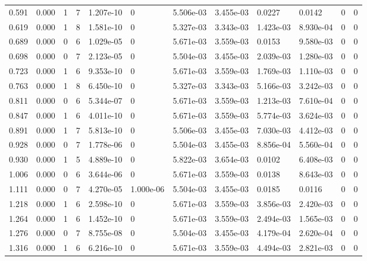 \documentclass[preview]{standalone}
\begin{document}
{{\begin{tabular}{L{1.2cm}C{1.2cm} C{0.3cm}C{0.5cm} C{1.4cm}C{1.4cm} C{1.4cm}C{1.4cm} C{1.6cm}C{1.6cm} C{1.6cm}C{1.6cm}}
  0.591  &  0.000  & 1     &  7 &  1.207e-10  & 0  &  5.506e-03&   3.455e-03& 0.0227 & 0.0142   &  0 & 0  \\ 
  0.619  &  0.000  & 1     &  8 &  1.581e-10  & 0  &  5.327e-03&   3.343e-03& 1.423e-03 & 8.930e-04   &  0 & 0  \\ 
  0.689  &  0.000  & 0     &  6 &  1.029e-05  & 0  &  5.671e-03&   3.559e-03& 0.0153 & 9.580e-03   &  0 & 0  \\ 
  0.698  &  0.000  & 0     &  7 &  2.123e-05  & 0  &  5.504e-03&   3.455e-03& 2.039e-03 & 1.280e-03   &  0 & 0  \\ 
  0.723  &  0.000  & 1     &  6 &  9.353e-10  & 0  &  5.671e-03&   3.559e-03& 1.769e-03 & 1.110e-03   &  0 & 0  \\ 
  0.763  &  0.000  & 1     &  8 &  6.450e-10  & 0  &  5.327e-03&   3.343e-03& 5.166e-03 & 3.242e-03   &  0 & 0  \\ 
  0.811  &  0.000  & 0     &  6 &  5.344e-07  & 0  &  5.671e-03&   3.559e-03& 1.213e-03 & 7.610e-04   &  0 & 0  \\ 
  0.847  &  0.000  & 1     &  6 &  4.011e-10  & 0  &  5.671e-03&   3.559e-03& 5.774e-03 & 3.624e-03   &  0 & 0  \\ 
  0.891  &  0.000  & 1     &  7 &  5.813e-10  & 0  &  5.506e-03&   3.455e-03& 7.030e-03 & 4.412e-03   &  0 & 0  \\ 
  0.928  &  0.000  & 0     &  7 &  1.778e-06  & 0  &  5.504e-03&   3.455e-03& 8.856e-04 & 5.560e-04   &  0 & 0  \\ 
  0.930  &  0.000  & 1     &  5 &  4.889e-10  & 0  &  5.822e-03&   3.654e-03& 0.0102 & 6.408e-03   &  0 & 0  \\ 
  1.006  &  0.000  & 0     &  6 &  3.644e-06  & 0  &  5.671e-03&   3.559e-03& 0.0138 & 8.643e-03   &  0 & 0  \\ 
  1.111  &  0.000  & 0     &  7 &  4.270e-05  & 1.000e-06  &  5.504e-03&   3.455e-03& 0.0185 & 0.0116   &  0 & 0  \\ 
  1.218  &  0.000  & 1     &  6 &  2.598e-10  & 0  &  5.671e-03&   3.559e-03& 3.856e-03 & 2.420e-03   &  0 & 0  \\ 
  1.264  &  0.000  & 1     &  6 &  1.452e-10  & 0  &  5.671e-03&   3.559e-03& 2.494e-03 & 1.565e-03   &  0 & 0  \\ 
  1.276  &  0.000  & 0     &  7 &  8.755e-08  & 0  &  5.504e-03&   3.455e-03& 4.179e-04 & 2.620e-04   &  0 & 0  \\ 
  1.316  &  0.000  & 1     &  6 &  6.216e-10  & 0  &  5.671e-03&   3.559e-03& 4.494e-03 & 2.821e-03   &  0 & 0  \\ 

\end{tabular}}}
\end{document}
